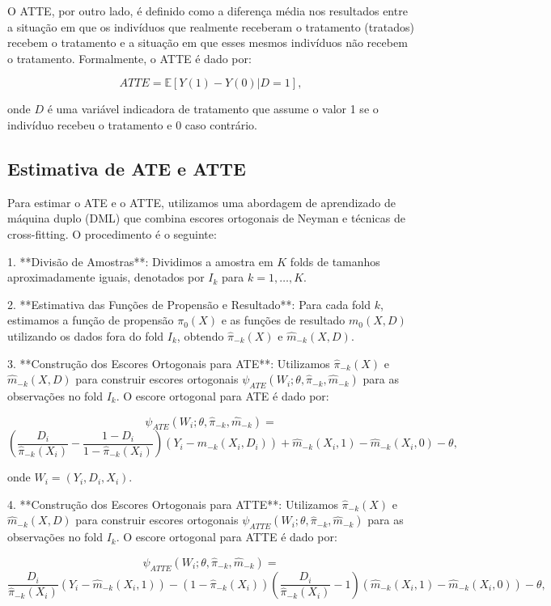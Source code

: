 \documentclass[a4paper,12pt]{article}[abntex2]
\begin{document}
O ATTE, por outro lado, é definido como a diferença média nos resultados entre a situação em que os indivíduos que realmente receberam o tratamento (tratados) recebem o tratamento e a situação em que esses mesmos indivíduos não recebem o tratamento. Formalmente, o ATTE é dado por:

\[
ATTE = \mathbb{E}[Y(1) - Y(0) | D = 1],
\]

onde $D$ é uma variável indicadora de tratamento que assume o valor 1 se o indivíduo recebeu o tratamento e 0 caso contrário.

\subsection*{Estimativa de ATE e ATTE}

Para estimar o ATE e o ATTE, utilizamos uma abordagem de aprendizado de máquina duplo (DML) que combina escores ortogonais de Neyman e técnicas de cross-fitting. O procedimento é o seguinte:

1. **Divisão de Amostras**: Dividimos a amostra em $K$ folds de tamanhos aproximadamente iguais, denotados por $I_k$ para $k = 1, \ldots, K$.

2. **Estimativa das Funções de Propensão e Resultado**: Para cada fold $k$, estimamos a função de propensão $\pi_0(X)$ e as funções de resultado $m_0(X, D)$ utilizando os dados fora do fold $I_k$, obtendo $\hat{\pi}_{-k}(X)$ e $\hat{m}_{-k}(X, D)$.

3. **Construção dos Escores Ortogonais para ATE**: Utilizamos $\hat{\pi}_{-k}(X)$ e $\hat{m}_{-k}(X, D)$ para construir escores ortogonais $\psi_{ATE}(W_i; \theta, \hat{\pi}_{-k}, \hat{m}_{-k})$ para as observações no fold $I_k$. O escore ortogonal para ATE é dado por:

\[
\psi_{ATE}(W_i; \theta, \hat{\pi}_{-k}, \hat{m}_{-k}) = 
\]
\[
\left( \frac{D_i}{\hat{\pi}_{-k}(X_i)} - \frac{1 - D_i}{1 - \hat{\pi}_{-k}(X_i)} \right)(Y_i - \hat{m}_{-k}(X_i, D_i)) + \hat{m}_{-k}(X_i, 1) - \hat{m}_{-k}(X_i, 0) - \theta,
\]

onde $W_i = (Y_i, D_i, X_i)$.

4. **Construção dos Escores Ortogonais para ATTE**: Utilizamos $\hat{\pi}_{-k}(X)$ e $\hat{m}_{-k}(X, D)$ para construir escores ortogonais $\psi_{ATTE}(W_i; \theta, \hat{\pi}_{-k}, \hat{m}_{-k})$ para as observações no fold $I_k$. O escore ortogonal para ATTE é dado por:

\[
\psi_{ATTE}(W_i; \theta, \hat{\pi}_{-k}, \hat{m}_{-k}) = 
\]
\[
\frac{D_i}{\hat{\pi}_{-k}(X_i)}(Y_i - \hat{m}_{-k}(X_i, 1)) - (1 - \hat{\pi}_{-k}(X_i))\left(\frac{D_i}{\hat{\pi}_{-k}(X_i)} - 1\right)(\hat{m}_{-k}(X_i, 1) - \hat{m}_{-k}(X_i, 0)) - \theta,
\]
\end{document}
